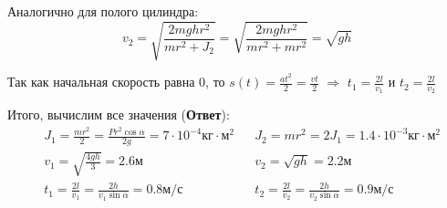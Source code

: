 \documentclass[a4paper,12pt]{article}
\begin{document}
    Аналогично для полого цилиндра:
    \begin{equation}
        v_2 = \sqrt{
            \frac{2mghr^2}{mr^2 + J_2}
        } = \sqrt{
            \frac{2mghr^2}{mr^2 + mr^2}
        } = \sqrt{
            gh
        }
    \end{equation}

    Так как начальная скорость равна 0, то $s(t) = \frac{at^2}{2} = \frac{vt}{2}$ $\Rightarrow$
    $t_1 = \frac{2l}{v_1}$ и $t_2 = \frac{2l}{v_2}$

    Итого, вычислим все значения (\textbf{Ответ}):
    \begin{equation}
        \begin{aligned}
            &J_1 = \frac{mr^2}{2} = \frac{Pr^2\cos\alpha}{2g} =  7\cdot 10^{-4} \text{кг}\cdot\text{м}^2 & 
            &J_2 = mr^2 = 2J_1 = 1.4 \cdot 10^{-3} \text{кг}\cdot\text{м}^2 \\
            &v_1 = \sqrt{
                \frac{4gh}{3}
            } = 2.6 \text{м}  &
            &v_2 = \sqrt{gh} = 2.2 \text{м} \\
            &t_1 = \frac{2l}{v_1} = \frac{2h}{v_1\sin\alpha} = 0.8 \text{м/с} &
            &t_2 = \frac{2l}{v_2} = \frac{2h}{v_2\sin\alpha} = 0.9 \text{м/с}
        \end{aligned}
    \end{equation}
\end{document}

